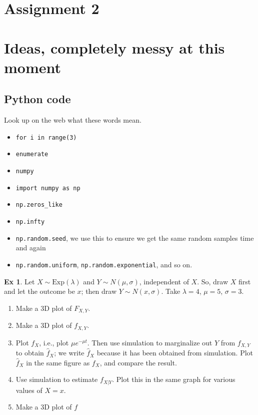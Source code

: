 \documentclass[a4paper]{article}
\theoremstyle{definition}
\newtheorem{exercise}{Ex}[section]
\newcommand{\Exp}[1]{\mathrm{Exp}(#1)}
\newcommand{\1}[1]{\,I_{#1}} %
\begin{document}
\section{Assignment 2}
\label{sec:assignment-2}



\section{Ideas, completely messy at this moment}
\label{sec:ideas-compl-messy}




\subsection{Python code}
\label{sec:org8074bd4}
Look up on the web what  these words mean. 
\begin{itemize}
\item \texttt{for i in range(3)}
\item \texttt{enumerate}
\item \texttt{numpy}
\item \texttt{import numpy as np}
\item \texttt{np.zeros\_like}
\item \texttt{np.infty}
\item \texttt{np.random.seed}, we  use this to ensure we get the same random samples time and again
\item \texttt{np.random.uniform}, \texttt{np.random.exponential}, and so on.
\end{itemize}


\begin{exercise}
Let $X\sim\Exp{\lambda}$ and $Y \sim N(\mu, \sigma)$, independent of $X$.
So, draw $X$ first and let the outcome be $x$; then draw $Y\sim N(x, \sigma)$.
Take $\lambda=4$, $\mu = 5$, $\sigma=3$.
\begin{enumerate}
\item Make a 3D plot of $F_{X,Y}$.
\item Make a 3D plot of $f_{X,Y}$.
\item Plot $f_{X}$, i.e., plot $\mu e^{-\mu t}$.
  Then use simulation to marginalize out $Y$ from $f_{X,Y}$ to obtain $\hat f_X$; we write $\hat f_X$ because it has been obtained from simulation.
  Plot $\hat f_X$ in the same figure as $f_X$, and compare the result.
\item Use simulation to estimate $f_{X|Y}$. Plot this in the same graph for various values of $X=x$. 
\item Make a 3D plot of $f$
\end{enumerate}
\end{exercise}
\end{document}
